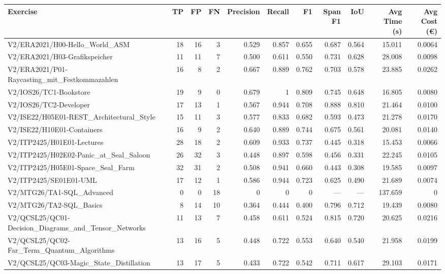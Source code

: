 \begin{tabular}{lrrrrrrrrrr}
Exercise & TP & FP & FN & Precision & Recall & F1 & Span F1 & IoU & Avg Time (s) & Avg Cost (€) \\
\hline
V2/ERA2021/H00-Hello\_World\_ASM & 18 & 16 & 3 & 0.529 & 0.857 & 0.655 & 0.687 & 0.564 & 15.011 & 0.0064 \\
V2/ERA2021/H03-Grafikspeicher & 11 & 11 & 7 & 0.500 & 0.611 & 0.550 & 0.731 & 0.628 & 28.008 & 0.0098 \\
V2/ERA2021/P01-Raycasting\_mit\_Festkommazahlen & 16 & 8 & 2 & 0.667 & 0.889 & 0.762 & 0.703 & 0.578 & 23.885 & 0.0262 \\
V2/IOS26/TC1-Bookstore & 19 & 9 & 0 & 0.679 & 1 & 0.809 & 0.745 & 0.648 & 16.805 & 0.0080 \\
V2/IOS26/TC2-Developer & 17 & 13 & 1 & 0.567 & 0.944 & 0.708 & 0.888 & 0.810 & 21.464 & 0.0100 \\
V2/ISE22/H05E01-REST\_Architectural\_Style & 15 & 11 & 3 & 0.577 & 0.833 & 0.682 & 0.593 & 0.473 & 21.278 & 0.0170 \\
V2/ISE22/H10E01-Containers & 16 & 9 & 2 & 0.640 & 0.889 & 0.744 & 0.675 & 0.561 & 20.081 & 0.0140 \\
V2/ITP2425/H01E01-Lectures & 28 & 18 & 2 & 0.609 & 0.933 & 0.737 & 0.445 & 0.318 & 15.453 & 0.0066 \\
V2/ITP2425/H02E02-Panic\_at\_Seal\_Saloon & 26 & 32 & 3 & 0.448 & 0.897 & 0.598 & 0.456 & 0.331 & 22.245 & 0.0105 \\
V2/ITP2425/H05E01-Space\_Seal\_Farm & 32 & 31 & 2 & 0.508 & 0.941 & 0.660 & 0.443 & 0.308 & 19.585 & 0.0097 \\
V2/ITP2425/SE01E01-UML & 17 & 12 & 1 & 0.586 & 0.944 & 0.723 & 0.625 & 0.490 & 21.689 & 0.0074 \\
V2/MTG26/TA1-SQL\_Advanced & 0 & 0 & 18 & 0 & 0 & 0 & — & — & 137.659 & 0 \\
V2/MTG26/TA2-SQL\_Basics & 8 & 14 & 10 & 0.364 & 0.444 & 0.400 & 0.796 & 0.712 & 19.439 & 0.0080 \\
V2/QCSL25/QC01-Decision\_Diagrams\_and\_Tensor\_Networks & 11 & 13 & 7 & 0.458 & 0.611 & 0.524 & 0.815 & 0.720 & 20.625 & 0.0216 \\
V2/QCSL25/QC02-Far\_Term\_Quantum\_Algorithms & 13 & 16 & 5 & 0.448 & 0.722 & 0.553 & 0.640 & 0.540 & 21.958 & 0.0199 \\
V2/QCSL25/QC03-Magic\_State\_Distillation & 13 & 17 & 5 & 0.433 & 0.722 & 0.542 & 0.711 & 0.617 & 29.103 & 0.0171 \\
\end{tabular}
